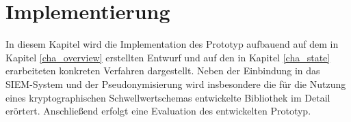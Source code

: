 \chapter{Implementierung}

\label{cha_implementation}

In diesem Kapitel wird die Implementation des Prototyp aufbauend auf dem in Kapitel \ref{cha_overview} erstellten Entwurf und auf den in Kapitel \ref{cha_state} erarbeiteten konkreten Verfahren dargestellt. Neben der Einbindung in das SIEM-System und der Pseudonymisierung wird insbesondere die für die Nutzung eines kryptographischen Schwellwertschemas entwickelte Bibliothek im Detail erörtert. Anschließend erfolgt eine Evaluation des entwickelten Prototyp.























